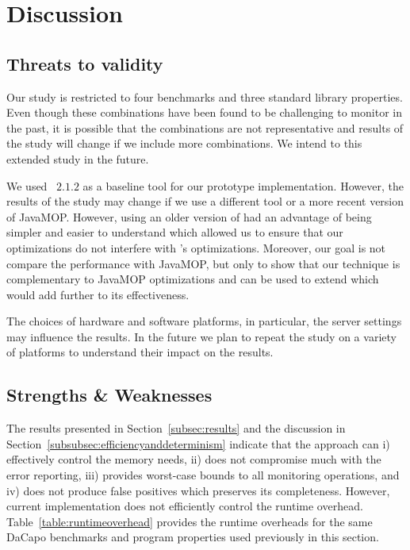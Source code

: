 \section{Discussion}
\label{sec:discussion}

\subsection{Threats to validity}
\label{sec:discussion:ttv}

Our study is restricted to four \dacapo benchmarks and three \java standard
library properties. Even though these combinations have been found to be
challenging to monitor in the past, it is possible that the combinations are not
representative and results of the study will change if we include more
combinations. We intend to this extended study in the future.

We used \javamop\ $2.1.2$ as a baseline tool for our prototype implementation. 
However, the results of the study may change if we use a different tool or a 
more recent version of JavaMOP. However, using an older version of \javamop had 
an advantage of being simpler and easier to understand which allowed us to 
ensure that our optimizations do not interfere with \javamop's optimizations. 
Moreover, our goal is not compare the performance with JavaMOP, but only to show 
that our technique is complementary to JavaMOP optimizations and can be used to 
extend \javamop which would add further to its effectiveness.

The choices of hardware and software platforms, in particular, the server 
settings may influence the results. In the future we plan to repeat the study on 
a variety of platforms to understand their impact on the results.

\subsection{Strengths \& Weaknesses}
\label{sec:discussion:snw}

The results presented in Section~\ref{subsec:results} and the discussion in 
Section~\ref{subsubsec:efficiencyanddeterminism} indicate that the approach can 
i) effectively control the memory needs, ii) does not compromise much with the 
error reporting, iii) provides worst-case bounds to all monitoring operations, 
and iv) does not produce false positives which preserves its completeness. 
However, current implementation does not efficiently control the runtime 
overhead. Table~\ref{table:runtimeoverhead} provides the runtime overheads for 
the same DaCapo benchmarks and program properties used previously in this 
section.

